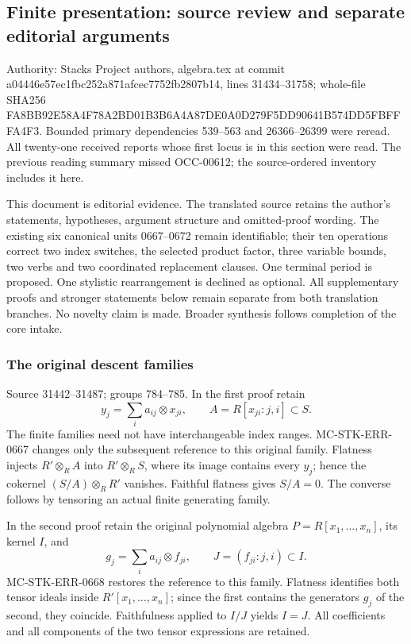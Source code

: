 \subsection{Finite presentation: source review and separate editorial arguments}\label{algebra-proof-035-finite-presentation-source-review-and-separate-editorial-arguments}

Authority: Stacks Project authors, algebra.tex at commit a04446e57ec1fbc252a871afcec7752fb2807b14, lines 31434--31758; whole-file SHA256 FA8BB92E58A4F78A2BD01B3B6A4A87DE0A0D279F5DD90641B574DD5FBFFFA4F3. Bounded primary dependencies 539--563 and 26366--26399 were reread. All twenty-one received reports whose first locus is in this section were read. The previous reading summary missed OCC-00612; the source-ordered inventory includes it here.

This document is editorial evidence. The translated source retains the author's statements, hypotheses, argument structure and omitted-proof wording. The existing six canonical units 0667--0672 remain identifiable; their ten operations correct two index switches, the selected product factor, three variable bounds, two verbs and two coordinated replacement clauses. One terminal period is proposed. One stylistic rearrangement is declined as optional. All supplementary proofs and stronger statements below remain separate from both translation branches. No novelty claim is made. Broader synthesis follows completion of the core intake.

\subsubsection{The original descent families}\label{algebra-proof-035-the-original-descent-families}

Source 31442--31487; groups 784--785. In the first proof retain \[
y_j=\sum_i a_{ij}\otimes x_{ji},\qquad
A=R[x_{ji}:j,i]\subset S.
\] The finite families need not have interchangeable index ranges. MC-STK-ERR-0667 changes only the subsequent reference to this original family. Flatness injects \(R'\otimes_R A\) into \(R'\otimes_R S\), where its image contains every \(y_j\); hence the cokernel \((S/A)\otimes_R R'\) vanishes. Faithful flatness gives \(S/A=0\). The converse follows by tensoring an actual finite generating family.

In the second proof retain the original polynomial algebra \(P=R[x_1,\ldots,x_n]\), its kernel \(I\), and \[
g_j=\sum_i a_{ij}\otimes f_{ji},\qquad
J=(f_{ji}:j,i)\subset I.
\] MC-STK-ERR-0668 restores the reference to this family. Flatness identifies both tensor ideals inside \(R'[x_1,\ldots,x_n]\); since the first contains the generators \(g_j\) of the second, they coincide. Faithfulness applied to \(I/J\) yields \(I=J\). All coefficients and all components of the two tensor expressions are retained.


